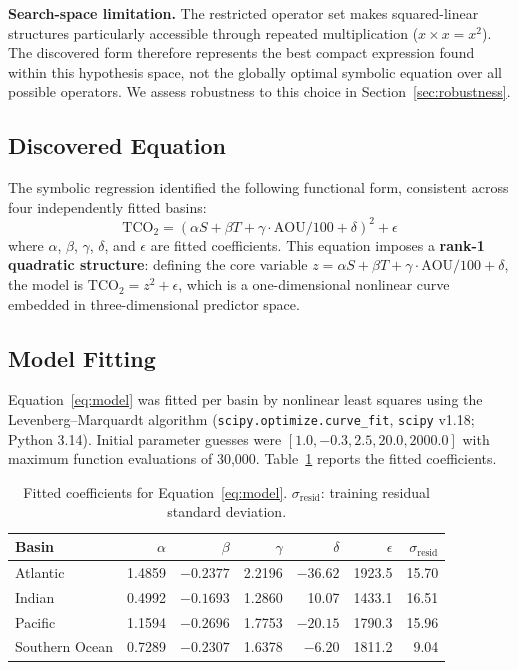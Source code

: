 \documentclass[12pt,a4paper]{article}
\begin{document}
\textbf{Search-space limitation.} The restricted operator set makes squared-linear structures particularly accessible through repeated multiplication ($x \times x = x^2$). The discovered form therefore represents the best compact expression found within this hypothesis space, not the globally optimal symbolic equation over all possible operators. We assess robustness to this choice in Section~\ref{sec:robustness}.

\subsection{Discovered Equation}

The symbolic regression identified the following functional form, consistent across four independently fitted basins:
\begin{equation}
\text{TCO}_2 = (\alpha S + \beta T + \gamma \cdot \text{AOU}/100 + \delta)^2 + \epsilon
\label{eq:model}
\end{equation}
where $\alpha$, $\beta$, $\gamma$, $\delta$, and $\epsilon$ are fitted coefficients. This equation imposes a \textbf{rank-1 quadratic structure}: defining the core variable $z = \alpha S + \beta T + \gamma \cdot \text{AOU}/100 + \delta$, the model is $\text{TCO}_2 = z^2 + \epsilon$, which is a one-dimensional nonlinear curve embedded in three-dimensional predictor space.

\subsection{Model Fitting}

Equation~\eqref{eq:model} was fitted per basin by nonlinear least squares using the Levenberg--Marquardt algorithm (\texttt{scipy.optimize.curve\_fit}, \texttt{scipy} v1.18; Python 3.14). Initial parameter guesses were $[1.0, -0.3, 2.5, 20.0, 2000.0]$ with maximum function evaluations of 30{,}000. Table~\ref{tab:coefficients} reports the fitted coefficients.

\begin{table}[htbp]
\centering
\caption{Fitted coefficients for Equation~\eqref{eq:model}. $\sigma_{\text{resid}}$: training residual standard deviation.}
\label{tab:coefficients}
\begin{tabular}{lrrrrrr}
\toprule
\textbf{Basin} & $\alpha$ & $\beta$ & $\gamma$ & $\delta$ & $\epsilon$ & $\sigma_{\text{resid}}$ \\
\midrule
Atlantic        & 1.4859 & $-0.2377$ & 2.2196 & $-36.62$ & 1923.5 & 15.70 \\
Indian          & 0.4992 & $-0.1693$ & 1.2860 &  10.07  & 1433.1 & 16.51 \\
Pacific         & 1.1594 & $-0.2696$ & 1.7753 & $-20.15$ & 1790.3 & 15.96 \\
Southern Ocean  & 0.7289 & $-0.2307$ & 1.6378 &  $-6.20$ & 1811.2 &  9.04 \\
\bottomrule
\end{tabular}
\end{table}
\end{document}
